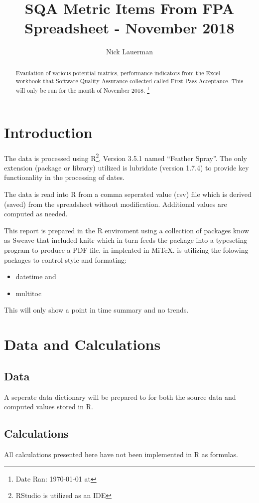 \documentclass{article}
\title{SQA Metric Items From FPA Spreadsheet - November 2018}
\author{Nick Lauerman}
\date{}
\begin{document}

\maketitle

\begin{abstract}
Evaulation of various potential matrics, performance indicators from the Excel
workbook that Software Quality Assurance collected called First Pass
Acceptance. This will only be run for the month of November 2018.
\footnote{Date Ran: \today{} at \currenttime}
\end{abstract}

\tableofcontents

\section{Introduction}
The data is processed using R\footnote{RStudio is utilized as an IDE}, Version
3.5.1 named ``Feather Spray''. The only extension (package or library) utilized is
lubridate (version 1.7.4) to provide key functionality in the processing of dates.

The data is read into R from a comma seperated value (csv) file which is derived (saved)
from the spreadsheet without modification. Additional values are computed as needed.

This report is prepared in the R enviroment using a collection of packages know as
Sweave that included knitr which in turn feeds the package into \LaTeXe{} a typeseting
program to produce a PDF file. \LaTeXe{} in implented in Mi\TeX. \LaTeXe{} is utilizing
the folowing packages to control style and formating:
\begin{itemize}
\item datetime and
\item multitoc
\end{itemize}

This will only show a point in time summary and no trends.

\section{Data and Calculations}
\subsection{Data}
A seperate data dictionary will be prepared to for both the source data
and computed values stored in R.

\subsection{Calculations}
All calculations presented here have not been implemented in R as formulas.
\end{document}
